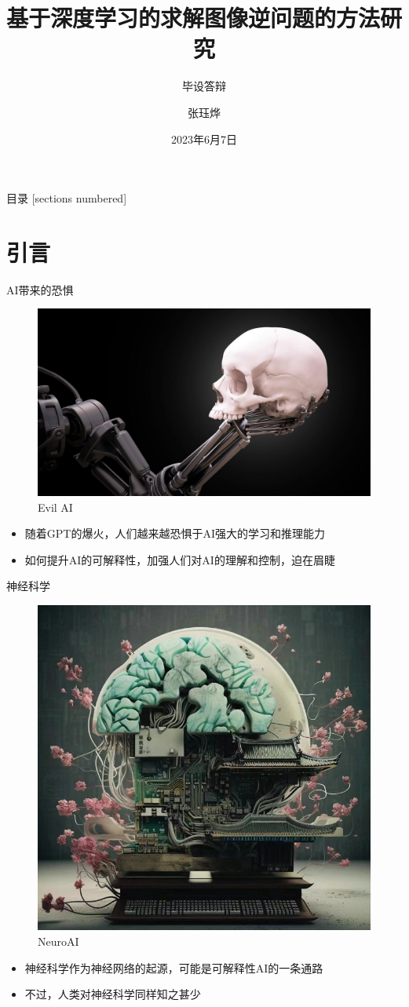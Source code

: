 \documentclass[10pt]{beamer}
\title{基于深度学习的求解图像逆问题的方法研究}
\subtitle{毕设答辩}
\date{2023年6月7日}
\author{张珏烨}
\institute{武汉理工大学计算机与人工智能学院}
\begin{document}
\maketitle

\begin{frame}{目录}
  [sections numbered]
  \tableofcontents[hideallsubsections]
\end{frame}

\section{引言}

\begin{frame}[fragile]{AI带来的恐惧}
  \begin{figure}[thbp!]
    \centering
    \includegraphics[width=0.8\linewidth]{imgs/ai.jpg}
    \caption{Evil AI}
    \label{fig:evil-ai}
    \end{figure}
  \begin{itemize}
    \item 随着GPT的爆火，人们越来越恐惧于AI强大的学习和推理能力
    \item 如何提升AI的可解释性，加强人们对AI的理解和控制，迫在眉睫
  \end{itemize}
\end{frame}

\begin{frame}[fragile]{神经科学}
  \begin{figure}[thbp!]
    \centering
    \includegraphics[width=0.5\linewidth]{imgs/CCN.jpg}
    \caption{NeuroAI}
    \label{fig:NeuroAI}
    \end{figure}
  
  \begin{itemize}
    \item 神经科学作为神经网络的起源，可能是可解释性AI的一条通路
    \item 不过，人类对神经科学同样知之甚少
  \end{itemize}
\end{frame}
\end{document}

